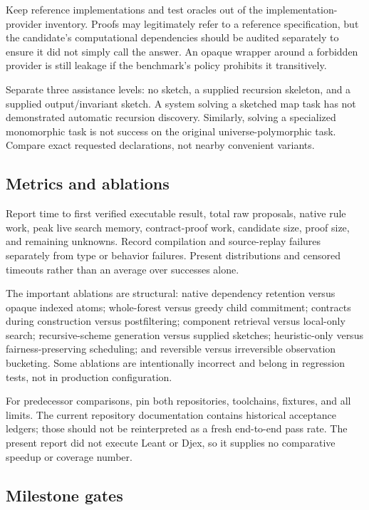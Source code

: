 Keep reference implementations and test oracles out of the implementation-provider inventory. Proofs may legitimately refer to a reference specification, but the candidate's computational dependencies should be audited separately to ensure it did not simply call the answer. An opaque wrapper around a forbidden provider is still leakage if the benchmark's policy prohibits it transitively.

Separate three assistance levels: no sketch, a supplied recursion skeleton, and a supplied output/invariant sketch. A system solving a sketched map task has not demonstrated automatic recursion discovery. Similarly, solving a specialized monomorphic task is not success on the original universe-polymorphic task. Compare exact requested declarations, not nearby convenient variants.

\subsection{Metrics and ablations}

Report time to first verified executable result, total raw proposals, native rule work, peak live search memory, contract-proof work, candidate size, proof size, and remaining unknowns. Record compilation and source-replay failures separately from type or behavior failures. Present distributions and censored timeouts rather than an average over successes alone.

The important ablations are structural: native dependency retention versus opaque indexed atoms; whole-forest versus greedy child commitment; contracts during construction versus postfiltering; component retrieval versus local-only search; recursive-scheme generation versus supplied sketches; heuristic-only versus fairness-preserving scheduling; and reversible versus irreversible observation bucketing. Some ablations are intentionally incorrect and belong in regression tests, not in production configuration.

For predecessor comparisons, pin both repositories, toolchains, fixtures, and all limits. The current repository documentation contains historical acceptance ledgers; those should not be reinterpreted as a fresh end-to-end pass rate. The present report did not execute Leant or Djex, so it supplies no comparative speedup or coverage number.

\subsection{Milestone gates}

